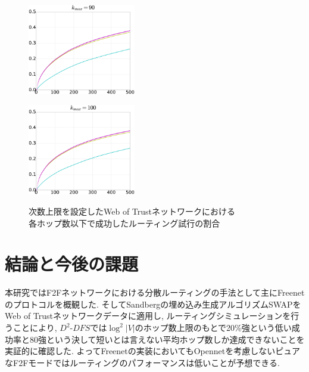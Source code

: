 \documentclass[dvipdfmx]{ampbt}
\begin{document}
\begin{figure}[htbp]
\begin{minipage}{0.33\hsize}
\begin{center}
     \end{center}
     \label{fig:32}
    \end{minipage}\begin{minipage}{0.33\hsize}
     \begin{center}
      \includegraphics[width=47mm]{../fig/cml_90clip.eps}
     \end{center}
     \label{fig:33}
    \end{minipage}
    \begin{center}
     \begin{minipage}{0.33\hsize}
      \centerline{\includegraphics[width=47mm]{../fig/cml_100clip.eps}}
      \label{fig:41}
     \end{minipage}
    \end{center}

    \caption{次数上限を設定したWeb of Trustネットワークにおける \\ 各ホップ数以下で成功したルーティング試行の割合}
    \label{fig:cml_dclip}
   \end{figure}


\section{結論と今後の課題}
本研究ではF2Fネットワークにおける分散ルーティングの手法として主にFreenetのプロトコルを概観した. そしてSandbergの埋め込み生成アルゴリズムSWAPをWeb of Trustネットワークデータに適用し, ルーティングシミュレーションを行うことにより, $D^2$-$DFS$では$\log^2|V|$のホップ数上限のもとで20\%強という低い成功率と80強という決して短いとは言えない平均ホップ数しか達成できないことを実証的に確認した. よってFreenetの実装においてもOpennetを考慮しないピュアなF2Fモードではルーティングのパフォーマンスは低いことが予想できる.
\end{document}
